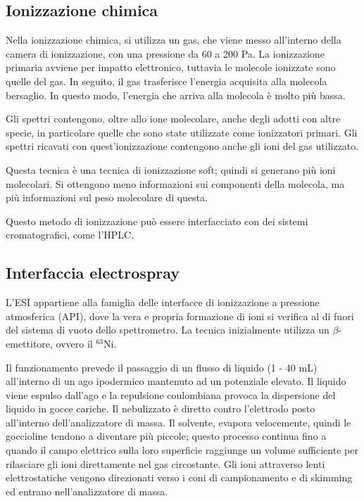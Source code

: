 \subsection{Ionizzazione chimica}
Nella ionizzazione chimica, si utilizza un gas, che viene messo all'interno della camera di ionizzazione, con una pressione da 60 a 200 Pa.
La ionizzazione primaria avviene per impatto elettronico, tuttavia le molecole ionizzate sono quelle del gas.
In seguito, il gas trasferisce l'energia acquisita alla molecola bersaglio.
In questo modo, l'energia che arriva alla molecola è molto più bassa.


Gli spettri contengono, oltre allo ione molecolare, anche degli adotti con altre specie, in particolare quelle che sono state utilizzate come ionizzatori primari.
Gli spettri ricavati con quest'ionizzazione contengono anche gli ioni del gas utilizzato.

Questa tecnica è una tecnica di ionizzazione soft; quindi si generano più ioni molecolari.
Si ottengono meno informazioni sui componenti della molecola, ma più informazioni sul peso molecolare di questa.

Questo metodo di ionizzazione può essere interfacciato con dei sistemi cromatografici, come l'HPLC.

\subsection{Interfaccia electrospray}
L'ESI appartiene alla famiglia delle interfacce di ionizzazione a pressione atmosferica (API), dove la vera e propria formazione di ioni si verifica al di fuori del sistema di vuoto dello spettrometro.
La tecnica inizialmente utilizza un $\beta$-emettitore, ovvero il $^{63}$Ni.


Il funzionamento prevede il passaggio di un flusso di liquido (1 - 40 mL) all'interno di un ago ipodermico mantenuto ad un potenziale elevato.
Il liquido viene espulso dall'ago e la repulsione coulombiana provoca la dispersione del liquido in gocce cariche.
Il nebulizzato è diretto contro l'elettrodo posto all'interno dell'analizzatore di massa.
Il solvente, evapora velocemente, quindi le goccioline tendono a diventare più piccole;
questo processo continua fino a quando il campo elettrico sulla loro superficie raggiunge un volume sufficiente per rilasciare gli ioni direttamente nel gas circostante.
Gli ioni attraverso lenti elettrostatiche vengono direzionati verso i coni di campionamento e di skimming ed entrano nell'analizzatore di massa.

